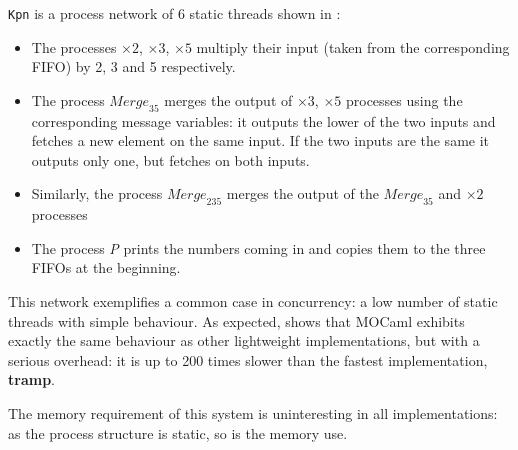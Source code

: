 \documentclass[12pt,twoside,notitlepage]{report}
\theoremstyle{plain}%
\theoremstyle{definition}
\theoremstyle{remark}
\begin{document}
\verb|Kpn| is a process network of 6 static threads shown in :
\begin{itemize}
\item{The processes $ \times \textit{2} $, $ \times \textit{3} $, $ \times \textit{5} $ multiply their input (taken from the corresponding FIFO) by 2, 3 and 5 respectively.}
\item{The process $ \textit{Merge}_{35} $ merges the output of $ \times \textit{3} $, $ \times \textit{5} $ processes using the corresponding message variables: it outputs the lower of the two inputs and fetches a new element on the same input. If the two inputs are the same it outputs only one, but fetches on both inputs.}
\item{Similarly, the process $ \textit{Merge}_{235} $ merges the output of the $ \textit{Merge}_{35} $ and $ \times \textit{2} $ processes}
\item{The process \textit{P} prints the numbers coming in and copies them to the three FIFOs at the beginning.}
\end{itemize}
This network exemplifies a common case in concurrency: a low number of static threads with simple behaviour. As expected,  shows that MOCaml exhibits exactly the same behaviour as other lightweight implementations, but with a serious overhead: it is up to 200 times slower than the fastest implementation, \textbf{tramp}.  

The memory requirement of this system is uninteresting in all implementations: as the process structure is static, so is the memory use.
\end{document}

